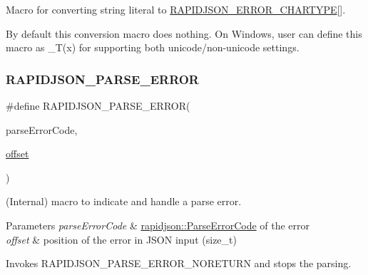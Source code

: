 Macro for converting string literal to \hyperlink{group__RAPIDJSON__ERRORS_ga7e4636fd48d0148f102b8a13f0539d8c}{R\+A\+P\+I\+D\+J\+S\+O\+N\+\_\+\+E\+R\+R\+O\+R\+\_\+\+C\+H\+A\+R\+T\+Y\+PE}\mbox{[}\mbox{]}. 

By default this conversion macro does nothing. On Windows, user can define this macro as {\ttfamily \+\_\+\+T(x)} for supporting both unicode/non-\/unicode settings. \mbox{\label{group__RAPIDJSON__ERRORS_gae3689840fa6e89a241313f33b602f865}} 
\subsubsection{\texorpdfstring{R\+A\+P\+I\+D\+J\+S\+O\+N\+\_\+\+P\+A\+R\+S\+E\+\_\+\+E\+R\+R\+OR}{RAPIDJSON\_PARSE\_ERROR}}
{\footnotesize\ttfamily \#define R\+A\+P\+I\+D\+J\+S\+O\+N\+\_\+\+P\+A\+R\+S\+E\+\_\+\+E\+R\+R\+OR(\begin{DoxyParamCaption}\item[{}]{parse\+Error\+Code,  }\item[{}]{\hyperlink{imgui__impl__opengl3__loader_8h_ae1b92ae085ddef4b1cdca7d749339fb0}{offset} }\end{DoxyParamCaption})}



(Internal) macro to indicate and handle a parse error. 


\begin{DoxyParams}{Parameters}
{\em parse\+Error\+Code} & \hyperlink{group__RAPIDJSON__ERRORS_ga8d4b32dfc45840bca189ade2bbcb6ba7}{rapidjson\+::\+Parse\+Error\+Code} of the error \\
\hline
{\em offset} & position of the error in J\+S\+ON input ({\ttfamily size\+\_\+t})\\
\hline
\end{DoxyParams}
Invokes R\+A\+P\+I\+D\+J\+S\+O\+N\+\_\+\+P\+A\+R\+S\+E\+\_\+\+E\+R\+R\+O\+R\+\_\+\+N\+O\+R\+E\+T\+U\+RN and stops the parsing.

